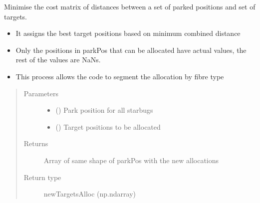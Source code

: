 \documentclass[letterpaper,10pt,english]{sphinxmanual}
\begin{document}
\begin{fulllineitems}
\label{\detokenize{reference:taipanPyRouter.optimiseAllocation}}
Minimise the cost matrix of distances between a set of parked positions and set of targets.
\begin{itemize}
\item {} 
It assigns the best target positions based on minimum combined distance

\item {} 
Only the positions in parkPos that can be allocated have actual values, the rest of the values are NaNs.

\item {} 
This process allows the code to segment the allocation by fibre type

\end{itemize}
\begin{quote}\begin{description}
\item[{Parameters}] \leavevmode\begin{itemize}
\item {} 
 () \textendash{} Park position for all starbugs

\item {} 
 () \textendash{} Target positions to be allocated

\end{itemize}

\item[{Returns}] \leavevmode
Array of same shape of parkPos with the new allocations

\item[{Return type}] \leavevmode
newTargetsAlloc (np.ndarray)

\end{description}\end{quote}

\end{fulllineitems}

\end{document}
